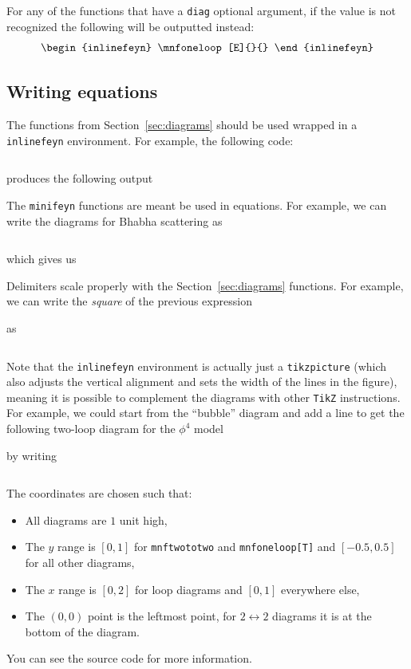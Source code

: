 \documentclass[11pt,a4paper]{article}
\begin{document}
For any of the functions that have a \texttt{diag} optional argument, if the value is not recognized the following will be outputted instead:
\begin{equation}
    \begin{inlinefeyn}
        \mnfoneloop[E]{}{}
    \end{inlinefeyn}
\end{equation}

\subsection{Writing equations}

The functions from Section~\ref{sec:diagrams} should be used wrapped in a \texttt{inlinefeyn} environment.
For example, the following code:
\inputminted[bgcolor=Beige]{latex}{include/equation1.tex}
produces the following output

The \texttt{minifeyn} functions are meant be used in equations.
For example, we can write the diagrams for Bhabha scattering as
\inputminted[bgcolor=Beige]{latex}{include/equation2.tex}
which gives us

Delimiters scale properly with the Section~\ref{sec:diagrams} functions.
For example, we can write the \textit{square} of the previous expression

as
\inputminted[bgcolor=Beige]{latex}{include/equation3.tex}
Note that the \texttt{inlinefeyn} environment is actually just a \texttt{tikzpicture}
(which also adjusts the vertical alignment and sets the width of the lines in the figure),
meaning it is possible to complement the diagrams with other \texttt{TikZ} instructions.
For example, we could start from the ``bubble'' diagram and add a line to get the following two-loop diagram for the $\phi^4$ model

by writing
\inputminted[bgcolor=Beige]{latex}{include/equation4.tex}
The coordinates are chosen such that:
\begin{itemize}
    \item All diagrams are $1$ unit high,
    \item The $y$ range is $[0,1]$ for \texttt{mnftwototwo} and \texttt{mnfoneloop[T]} and $[-0.5,0.5]$ for all other diagrams,
    \item The $x$ range is $[0,2]$ for loop diagrams and $[0,1]$ everywhere else,
    \item The $(0,0)$ point is the leftmost point, for $2\leftrightarrow 2$ diagrams it is at the bottom of the diagram.
\end{itemize}
You can see the source code for more information.
\end{document}
